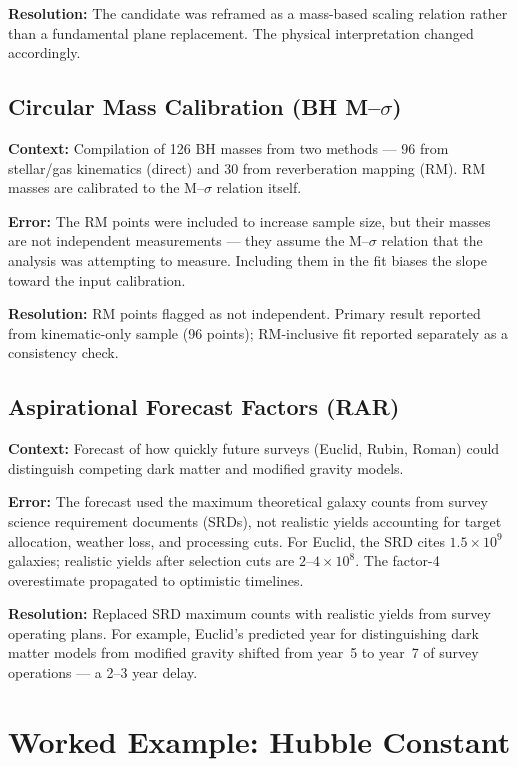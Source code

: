 \documentclass[twocolumn]{aastex631}
\begin{document}
\textbf{Resolution:} The candidate was reframed as a mass-based scaling
relation rather than a fundamental plane replacement.  The physical
interpretation changed accordingly.

\subsection{Circular Mass Calibration (BH M--$\sigma$)}

\textbf{Context:} Compilation of 126 BH masses from two methods ---
96 from stellar/gas kinematics (direct) and 30 from reverberation
mapping (RM).  RM masses are calibrated to the M--$\sigma$ relation
itself.

\textbf{Error:} The RM points were included to increase sample size,
but their masses are not independent measurements --- they assume the
M--$\sigma$ relation that the analysis was attempting to measure.
Including them in the fit biases the slope toward the input calibration.

\textbf{Resolution:} RM points flagged as not independent.  Primary
result reported from kinematic-only sample (96 points); RM-inclusive
fit reported separately as a consistency check.

\subsection{Aspirational Forecast Factors (RAR)}

\textbf{Context:} Forecast of how quickly future surveys (Euclid, Rubin,
Roman) could distinguish competing dark matter and modified gravity
models.

\textbf{Error:} The forecast used the maximum theoretical galaxy counts
from survey science requirement documents (SRDs), not realistic yields
accounting for target allocation, weather loss, and processing cuts.
For Euclid, the SRD cites $1.5\times10^9$ galaxies; realistic yields
after selection cuts are $2$--$4\times10^8$.  The factor-4 overestimate
propagated to optimistic timelines.

\textbf{Resolution:} Replaced SRD maximum counts with realistic yields
from survey operating plans.  For example, Euclid's predicted year for
distinguishing dark matter models from modified gravity shifted from
year~5 to year~7 of survey operations --- a 2--3 year delay.

\section{Worked Example: Hubble Constant}
\end{document}
